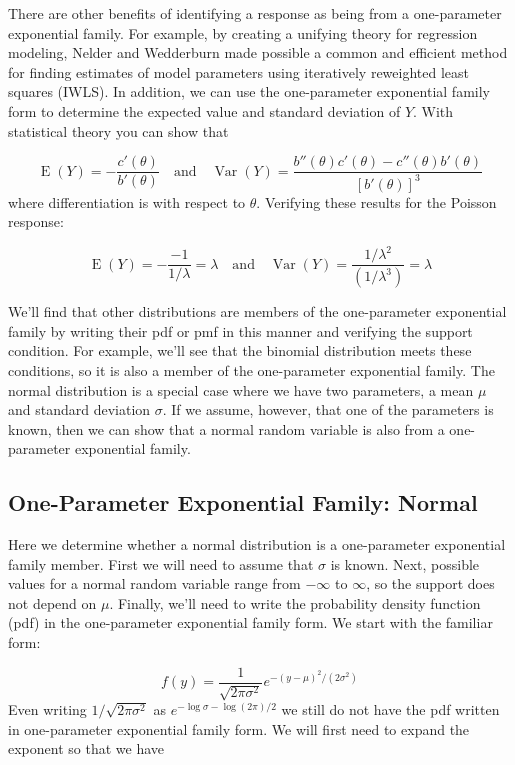 \documentclass[
]{krantz}
\newcommand{\E}{\operatorname{E}}
\newcommand{\var}{\operatorname{Var}}
\begin{document}
There are other benefits of identifying a response as being from a one-parameter exponential family. For example, by creating a unifying theory for regression modeling, Nelder and Wedderburn made possible a common and efficient method for finding estimates of model parameters using iteratively reweighted least squares (IWLS). In addition, we can use the one-parameter exponential family form to determine the expected value and standard deviation of \(Y\). With statistical theory you can show that

\[\E(Y) =-\frac{c'(\theta)}{b'(\theta)} \quad \textrm{and} \quad \var(Y) =\frac{b''(\theta)c'(\theta)-c''(\theta)b'(\theta)}{[b'(\theta)]^3}
\]
where differentiation is with respect to \(\theta\). Verifying these results for the Poisson response:

\[\E(Y)=-\frac{-1}{1/\lambda}=\lambda \quad \textrm{and} \quad  \var(Y)=\frac{1/{{\lambda}^2}}
{(1/{\lambda}^3)}=\lambda
\]

We'll find that other distributions are members of the one-parameter exponential family by writing their pdf or pmf in this manner and verifying the support condition. For example, we'll see that the binomial distribution meets these conditions, so it is also a member of the one-parameter exponential family. The normal distribution is a special case where we have two parameters, a mean \(\mu\) and standard deviation \(\sigma\). If we assume, however, that one of the parameters is known, then we can show that a normal random variable is also from a one-parameter exponential family.

\subsection{One-Parameter Exponential Family: Normal}\label{one-parameter-exponential-family-normal}

Here we determine whether a normal distribution is a one-parameter exponential family member. First we will need to assume that \(\sigma\) is known. Next, possible values for a normal random variable range from \(-\infty\) to \(\infty\), so the support does not depend on \(\mu\). Finally, we'll need to write the probability density function (pdf) in the one-parameter exponential family form. We start with the familiar form:

\[
f(y)=\frac{1}{{\sqrt{2\pi\sigma^2}}}{e^{-{(y-\mu)^2}/{(2\sigma^2)}}}
\]
Even writing \({1/{\sqrt{2\pi\sigma^2}}}\) as \(e^{-\log{\sigma}-\log(2\pi)/2}\) we still do not have the pdf written in one-parameter exponential family form. We will first need to expand the exponent so that we have
\end{document}

